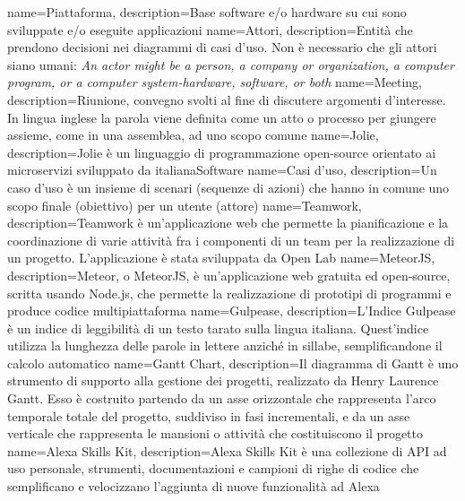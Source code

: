  {
	name=Piattaforma,
	description={Base software e/o hardware su cui sono sviluppate e/o eseguite applicazioni}
}
 {
	name=Attori,
	description={Entità che prendono decisioni nei diagrammi di casi d'uso. Non è necessario che gli attori siano umani: \textit{An actor might be a person, a company or organization, a computer program, or a computer system-hardware, software, or both}}
}
 {
	name=Meeting,
	description={Riunione, convegno svolti al fine di discutere argomenti d'interesse. In lingua inglese la parola viene definita come un atto o processo per giungere assieme, come in una assemblea, ad uno scopo comune}
}
 {
	name=Jolie,
	description={Jolie è un linguaggio di programmazione open-source orientato ai microservizi sviluppato da italianaSoftware}
}
 {
	name=Casi d'uso,
	description={Un caso d'uso è un insieme di scenari (sequenze di azioni) che hanno in comune uno scopo finale (obiettivo) per un utente (attore)}
}
 {
	name=Teamwork,
	description={Teamwork è un'applicazione web che permette la pianificazione e la coordinazione di varie attività fra i componenti di un team per la realizzazione di un progetto. L'applicazione è stata sviluppata da Open Lab}
}
 {
	name=MeteorJS,
	description={Meteor, o MeteorJS, è un'applicazione web gratuita ed open-source, scritta usando Node.js, che permette la realizzazione di prototipi di programmi e produce codice multipiattaforma}
}
 {
	name=Gulpease,
	description={L'Indice Gulpease è un indice di leggibilità di un testo tarato sulla lingua italiana. Quest'indice utilizza la lunghezza delle parole in lettere anziché in sillabe, semplificandone il calcolo automatico}
}
 {
	name=Gantt Chart,
	description={Il diagramma di Gantt è uno strumento di supporto alla gestione dei progetti, realizzato da Henry Laurence Gantt. Esso è costruito partendo da un asse orizzontale che rappresenta l'arco temporale totale del progetto, suddiviso in fasi incrementali, e da un asse verticale che rappresenta le mansioni o attività che costituiscono il progetto}
}
 {
	name=Alexa Skills Kit,
	description={Alexa Skills Kit è una collezione di API ad uso personale, strumenti, documentazioni e campioni di righe di codice che semplificano e velocizzano l'aggiunta di nuove funzionalità ad Alexa}
}
